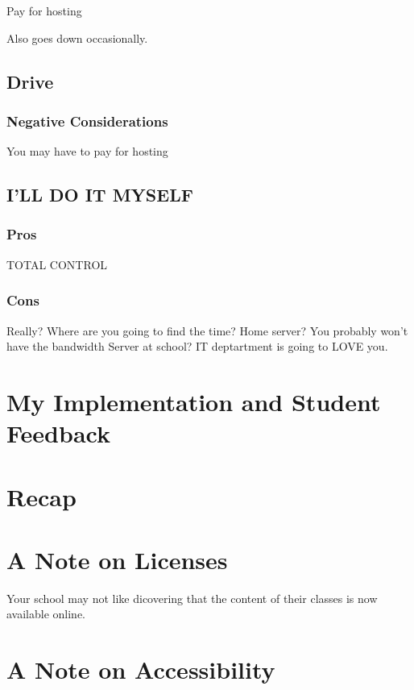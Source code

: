 \documentclass[sigconf]{acmart}
\begin{document}
Pay for hosting

Also goes down occasionally.

\subsection{Drive}



\subsubsection{Negative Considerations}
You may have to pay for hosting


\subsection{I'LL DO IT MYSELF}


\subsubsection{Pros}
TOTAL CONTROL
\subsubsection{Cons}

Really?  Where are you going to find the time?
Home server? You probably won't have the bandwidth
Server at school?  IT deptartment is going to LOVE you.


\section{My Implementation and Student Feedback}

\section{Recap}



\section{A Note on Licenses}



Your school may not like dicovering that the content of their classes is now available online.

\section{A Note on Accessibility}


\end{document}
